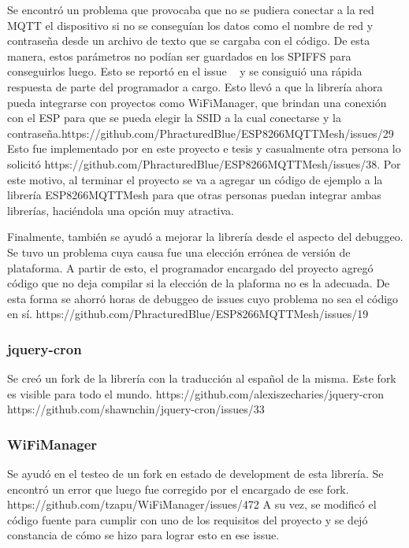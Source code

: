 Se encontró un problema que provocaba que no se pudiera conectar a la red MQTT el dispositivo si no se conseguían los datos como el nombre de red y contraseña desde un archivo de texto que se cargaba con el código. De esta manera, estos parámetros no podían ser guardados en los SPIFFS para conseguirlos luego. Esto se reportó en el issue ~\cite{Topic2} y se consiguió una rápida respuesta de parte del programador a cargo. Esto llevó a que la librería ahora pueda integrarse con proyectos como WiFiManager, que brindan una conexión con el ESP para que se pueda elegir la SSID a la cual conectarse y la contraseña.https://github.com/PhracturedBlue/ESP8266MQTTMesh/issues/29  Esto fue implementado por en este proyecto e tesis y casualmente otra persona lo solicitó https://github.com/PhracturedBlue/ESP8266MQTTMesh/issues/38. Por este motivo, al terminar el proyecto se va a agregar un código de ejemplo a la librería  ESP8266MQTTMesh para que otras personas puedan integrar ambas librerías, haciéndola una opción muy atractiva. 

Finalmente, también se ayudó a mejorar la librería desde el aspecto del debuggeo. Se tuvo un problema cuya causa fue una elección errónea de versión de plataforma. A partir de esto, el programador encargado del proyecto agregó código que no deja compilar si la elección de la plaforma no es la adecuada. De esta forma se ahorró horas de debuggeo de issues cuyo problema no sea el código en sí. https://github.com/PhracturedBlue/ESP8266MQTTMesh/issues/19 

\subsubsection{jquery-cron}

Se creó un fork de la librería con la traducción al español de la misma. Este fork es visible para todo el mundo. https://github.com/alexiszecharies/jquery-cron https://github.com/shawnchin/jquery-cron/issues/33 

\subsubsection{WiFiManager}

Se ayudó en el testeo de un fork en estado de development de esta librería. Se encontró un error que luego fue corregido por el encargado de ese fork. https://github.com/tzapu/WiFiManager/issues/472 A su vez, se modificó el código fuente para cumplir con uno de los requisitos del proyecto y se dejó constancia de cómo se hizo para lograr esto en ese issue.
